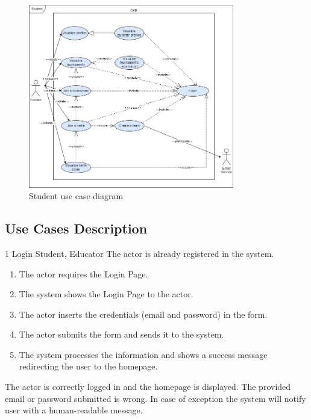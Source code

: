 \begin{figure}[H]
    \centering
    \includegraphics[width=0.8\textwidth]{images/use_cases_diagrams/students_functions.png}
    \caption{Student use case diagram}
\end{figure}
\clearpage

\subsection{Use Cases Description}
\usecase
{1}
{Login}
{Student, Educator}
{The actor is already registered in the system.}
{
    \begin{enumerate}
        \item The actor requires the Login Page.
        \item The system shows the Login Page to the actor.
        \item The actor inserts the credentials (email and password) in the form.
        \item The actor submits the form and sends it to the system.
        \item The system processes the information and shows a success message redirecting the user to the homepage.
    \end{enumerate}
}
{The actor is correctly logged in and the homepage is displayed.}
{
    The provided email or password submitted is wrong.
}
{
    In case of exception the system will notify user with a human-readable message.
}
\clearpage

